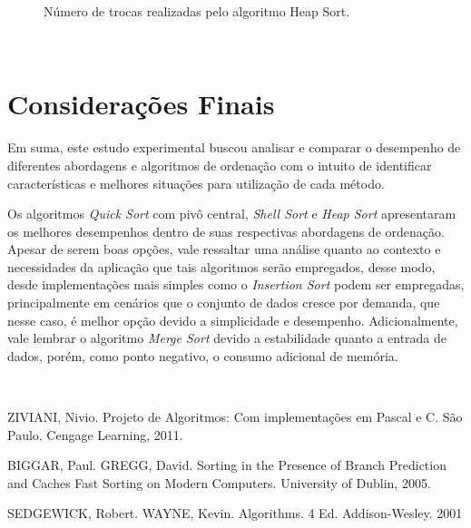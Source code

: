 \documentclass[conference,onecolumn]{IEEEtran}
\begin{document}
\begin{figure}[H]
\begin{center}
\end{center}
\caption{Número de trocas realizadas pelo algoritmo Heap Sort.}
\label{graf:heap-troca}
\end{figure}

~\\

\section{Considerações Finais}

Em suma, este estudo experimental buscou analisar e comparar o desempenho de diferentes abordagens e algoritmos de ordenação com o intuito de identificar características e melhores situações para utilização de cada método.

Os algoritmos \textit{Quick Sort} com pivô central, \textit{Shell Sort} e \textit{Heap Sort} apresentaram os melhores desempenhos dentro de suas respectivas abordagens de ordenação. Apesar de serem boas opções, vale ressaltar uma análise quanto ao contexto e necessidades da aplicação que tais algoritmos serão empregados, desse modo, desde implementações mais simples como o \textit{Insertion Sort} podem ser empregadas, principalmente em cenários que o conjunto de dados cresce por demanda, que nesse caso, é melhor opção devido a simplicidade e desempenho. Adicionalmente, vale lembrar o algoritmo \textit{Merge Sort} devido a estabilidade quanto a entrada de dados, porém, como ponto negativo, o consumo adicional de memória.

~\\
\begin{thebibliography}{9}

ZIVIANI, Nivio. Projeto de Algoritmos: Com implementações em Pascal e C. São Paulo. Cengage Learning, 2011.

BIGGAR, Paul. GREGG, David. Sorting in the Presence of Branch Prediction
and Caches Fast Sorting on Modern Computers. University of Dublin, 2005.

SEDGEWICK, Robert. WAYNE, Kevin. Algorithms. 4 Ed. Addison-Wesley. 2001

\end{thebibliography}

\end{document}
